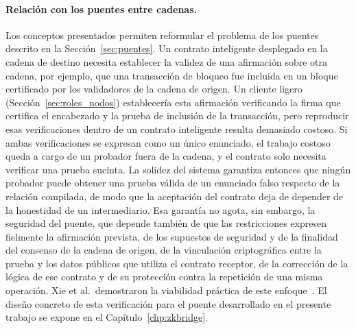 \paragraph{Relación con los puentes entre cadenas.} Los conceptos presentados permiten
reformular el problema de los puentes descrito en la Sección~\ref{sec:puentes}. Un contrato
inteligente desplegado en la cadena de destino necesita establecer la validez de una afirmación
sobre otra cadena, por ejemplo, que una transacción de bloqueo fue incluida en un bloque
certificado por los validadores de la cadena de origen. Un cliente ligero
(Sección~\ref{sec:roles_nodos}) establecería esta afirmación verificando la firma que certifica
el encabezado y la prueba de inclusión de la transacción, pero reproducir esas verificaciones
dentro de un contrato inteligente resulta demasiado costoso. Si ambas verificaciones se expresan
como un único enunciado, el trabajo costoso queda a cargo de un probador fuera de la cadena, y el
contrato solo necesita verificar una prueba sucinta. La solidez del sistema garantiza entonces
que ningún probador puede obtener una prueba válida de un enunciado falso respecto de la relación
compilada, de modo que la aceptación del contrato deja de depender de la honestidad de un
intermediario. Esa garantía no agota, sin embargo, la seguridad del puente, que depende también de
que las restricciones expresen fielmente la afirmación prevista, de los supuestos de seguridad y
de la finalidad del consenso de la cadena de origen, de la vinculación criptográfica entre la
prueba y los datos públicos que utiliza el contrato receptor, de la corrección de la lógica de
ese contrato y de su protección contra la repetición de una misma operación. Xie
et al.\ demostraron la viabilidad práctica de este enfoque~\cite{xie2022zkbridge}. El diseño concreto de esta verificación para el puente
desarrollado en el presente trabajo se expone en el Capítulo~\ref{chp:zkbridge}.
